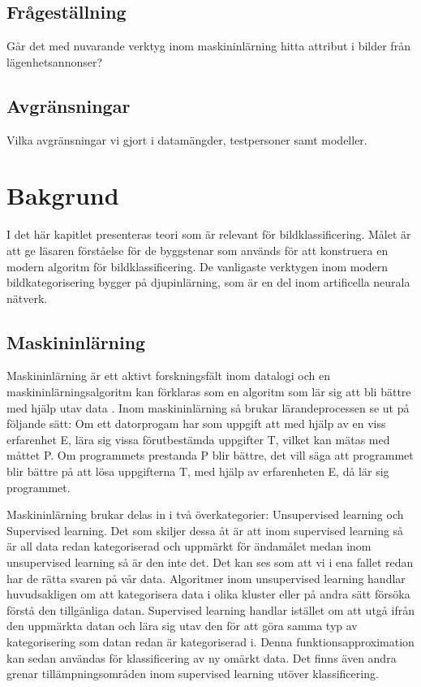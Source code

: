 \documentclass{kththesis}
\begin{document}
  \section{Frågeställning}
  Går det med nuvarande verktyg inom maskininlärning hitta attribut i bilder från lägenhetsannonser?


  \section{Avgränsningar}
  Vilka avgränsningar vi gjort i datamängder, testpersoner samt modeller.



\chapter{Bakgrund}
I det här kapitlet presenteras teori som är relevant för bildklassificering.
Målet är att ge läsaren förståelse för de byggstenar som används för att konstruera en modern algoritm för bildklassificering.
De vanligaste verktygen inom modern bildkategorisering bygger på djupinlärning, som är en del inom artificella neurala nätverk.


  \section{Maskininlärning}
  Maskininlärning är ett aktivt forskningsfält inom datalogi och en maskininlärningsalgoritm kan förklaras som en algoritm som lär sig att bli bättre med hjälp utav data \parencite{Goodfellow-et-al-2016}.
  Inom maskininlärning så brukar lärandeprocessen se ut på följande sätt: Om ett datorprogam har som uppgift att med hjälp av en viss erfarenhet E, lära sig vissa förutbestämda uppgifter T, vilket kan mätas med måttet P. Om programmets prestanda P blir bättre, det vill säga att programmet blir bättre på att lösa uppgifterna T, med hjälp av erfarenheten E, då lär sig programmet.

  Maskininlärning brukar delas in i två överkategorier: Unsupervised learning och Supervised learning.
  Det som skiljer dessa åt är att inom supervised learning så är all data redan kategoriserad och uppmärkt för ändamålet medan inom unsupervised learning så är den inte det. Det kan ses som att vi i ena fallet redan har de rätta svaren på vår data. 
  Algoritmer inom unsupervised learning handlar huvudsakligen om att kategorisera data i olika kluster eller på andra sätt försöka förstå den tillgänliga datan. 
  Supervised learning handlar istället om att utgå ifrån den uppmärkta datan och lära sig utav den för att göra samma typ av kategorisering som datan redan är kategoriserad i. 
  Denna funktionsapproximation kan sedan användas för klassificering av ny omärkt data.
  Det finns även andra grenar tillämpningsområden inom supervised learning utöver klassificering.
\end{document}
